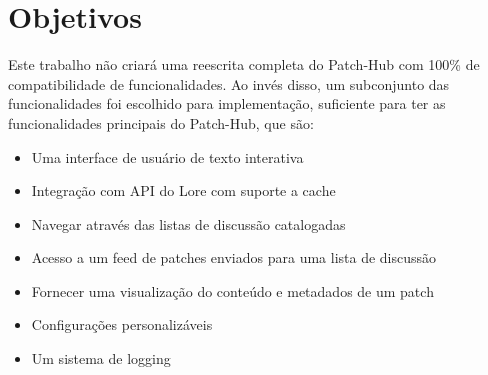 \section{Objetivos}

Este trabalho não criará uma reescrita completa do Patch-Hub com 100\% de compatibilidade de funcionalidades. Ao invés disso, um subconjunto das funcionalidades foi escolhido para implementação, suficiente para ter as funcionalidades principais do Patch-Hub, que são:

\begin{itemize}
    \item Uma interface de usuário de texto interativa
    \item Integração com API do Lore com suporte a cache
    \item Navegar através das listas de discussão catalogadas
    \item Acesso a um feed de patches enviados para uma lista de discussão
    \item Fornecer uma visualização do conteúdo e metadados de um patch
    \item Configurações personalizáveis
    \item Um sistema de logging
\end{itemize}
